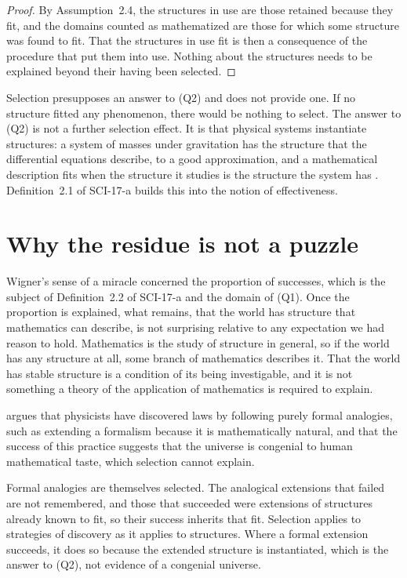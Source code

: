 \documentclass{situationist-preprint}
\begin{document}
\begin{proof}
By Assumption~2.4, the structures in use are those retained because they fit, and the domains counted as mathematized are those for which some structure was found to fit. That the structures in use fit is then a consequence of the procedure that put them into use. Nothing about the structures needs to be explained beyond their having been selected.
\end{proof}

Selection presupposes an answer to (Q2) and does not provide one. If no structure fitted any phenomenon, there would be nothing to select. The answer to (Q2) is not a further selection effect. It is that physical systems instantiate structures: a system of masses under gravitation has the structure that the differential equations describe, to a good approximation, and a mathematical description fits when the structure it studies is the structure the system has \citep{Pincock2012}. Definition~2.1 of SCI-17-a builds this into the notion of effectiveness.

\section{Why the residue is not a puzzle}

Wigner's sense of a miracle concerned the proportion of successes, which is the subject of Definition~2.2 of SCI-17-a and the domain of (Q1). Once the proportion is explained, what remains, that the world has structure that mathematics can describe, is not surprising relative to any expectation we had reason to hold. Mathematics is the study of structure in general, so if the world has any structure at all, some branch of mathematics describes it. That the world has stable structure is a condition of its being investigable, and it is not something a theory of the application of mathematics is required to explain.

\begin{objection}
\citet{Steiner1998} argues that physicists have discovered laws by following purely formal analogies, such as extending a formalism because it is mathematically natural, and that the success of this practice suggests that the universe is congenial to human mathematical taste, which selection cannot explain.
\end{objection}

\begin{reply}
Formal analogies are themselves selected. The analogical extensions that failed are not remembered, and those that succeeded were extensions of structures already known to fit, so their success inherits that fit. Selection applies to strategies of discovery as it applies to structures. Where a formal extension succeeds, it does so because the extended structure is instantiated, which is the answer to (Q2), not evidence of a congenial universe.
\end{reply}
\end{document}
